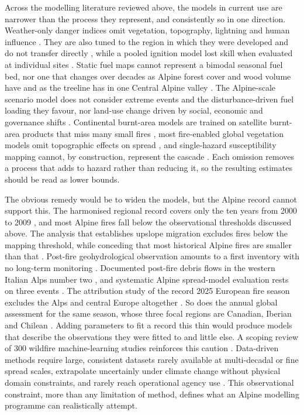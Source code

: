 \documentclass[11pt,a4paper]{article}
\begin{document}
Across the modelling literature reviewed above, the models in current use are narrower than the process they represent, and consistently so in one direction. Weather-only danger indices omit vegetation, topography, lightning and human influence \citep{muller_towards_2020}. They are also tuned to the region in which they were developed and do not transfer directly \citep{de_angelis_modelling_2015}, while a pooled ignition model lost skill when evaluated at individual sites \citep{gelabert_assessing_2025}. Static fuel maps cannot represent a bimodal seasonal fuel bed, nor one that changes over decades as Alpine forest cover and wood volume have \citep{bebi_changes_2017} and as the treeline has in one Central Alpine valley \citep{frei_evidence_2023}. The Alpine-scale scenario model does not consider extreme events and the disturbance-driven fuel loading they favour, nor land-use change driven by social, economic and governance shifts \citep{gerberding_mapping_2025}. Continental burnt-area models are trained on satellite burnt-area products that miss many small fires \citep{forrest_understanding_2024}, most fire-enabled global vegetation models omit topographic effects on spread \citep{jones_global_2022}, and single-hazard susceptibility mapping cannot, by construction, represent the cascade \citep{trucchia_defining_2022}. Each omission removes a process that adds to hazard rather than reducing it, so the resulting estimates should be read as lower bounds.

The obvious remedy would be to widen the models, but the Alpine record cannot support this. The harmonised regional record covers only the ten years from 2000 to 2009 \citep{conedera_characterizing_2018}, and most Alpine fires fall below the observational thresholds discussed above. The analysis that establishes upslope migration excludes fires below the mapping threshold, while conceding that most historical Alpine fires are smaller than that \citep{beloiu_climatedriven_2026}. Post-fire geohydrological observation amounts to a first inventory with no long-term monitoring \citep{melzner_wildfire-induced_2025}. Documented post-fire debris flows in the western Italian Alps number two \citep{tiranti_wildfires_2021}, and systematic Alpine spread-model evaluation rests on three events \citep{malanchini_modeling_2025}. The attribution study of the record 2025 European fire season excludes the Alps and central Europe altogether \citep{keeping_attribution_2026}. So does the annual global assessment for the same season, whose three focal regions are Canadian, Iberian and Chilean \citep{burton_state_2026}. Adding parameters to fit a record this thin would produce models that describe the observations they were fitted to and little else. A scoping review of 300 wildfire machine-learning studies reinforces this caution \citep{jain_review_2020}. Data-driven methods require large, consistent datasets rarely available at multi-decadal or fine spread scales, extrapolate uncertainly under climate change without physical domain constraints, and rarely reach operational agency use \citep{jain_review_2020}. This observational constraint, more than any limitation of method, defines what an Alpine modelling programme can realistically attempt.
\end{document}
